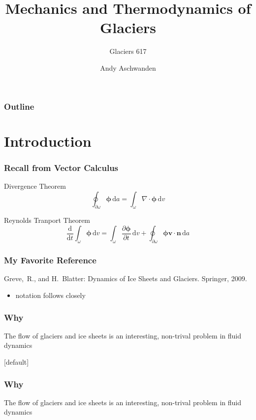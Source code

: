\documentclass[hide notes,intlimits]{beamer}
\title[Glacier Dynamics] %
{Mechanics and Thermodynamics of Glaciers}
\subtitle{Glaciers 617}
\author[Aschwanden] %
{Andy Aschwanden}
\institute[ARSC] %
{
  Arctic Region Supercomputing Center\\
  University of Alaska Fairbanks, USA
}
\begin{document}
\begin{frame}
  \titlepage
\end{frame}

\begin{frame}
 \frametitle{Outline}
 \tableofcontents[subsectionstyle=hide]
\end{frame}

\section{Introduction}


\begin{frame}
  \frametitle{Recall from Vector Calculus}
  \begin{block}{Divergence Theorem}
    \begin{equation}
      \oint_{\partial \omega} \boldsymbol{\phi} \,\text{d}a = 
      \int_{\omega} \nabla \cdot \boldsymbol{\phi} \, \text{d} v
    \end{equation}
  \end{block}
  \begin{block}{Reynolds Tranport Theorem}
    \begin{equation}
     \frac{\text{d}}{\text{d} t}\int_{\omega} \boldsymbol{\phi}\, \text{d} v =
     \int_{\omega} \frac{\partial \boldsymbol{\phi}}{\partial{t}} \, \text{d} v +
      \oint_{\partial \omega} \boldsymbol{\phi} \mathbf{v}\cdot\mathbf{n}\,\text{d}a 
    \end{equation}
  \end{block}
\end{frame}


\begin{frame}
  \frametitle{My Favorite Reference}
  Greve,~R., and H.~Blatter: Dynamics of Ice Sheets and Glaciers. Springer, 2009.
  \begin{itemize}
    \item notation follows closely
  \end{itemize}
\end{frame}


\begin{frame}
  \frametitle{Why}
  The flow of glaciers and ice sheets is an interesting, non-trival problem in fluid dynamics
\end{frame}

{
[default]
\begin{frame}
  \frametitle{Why}
  The flow of glaciers and ice sheets is an interesting, non-trival problem in fluid dynamics
\end{frame}
}   
\end{document}
